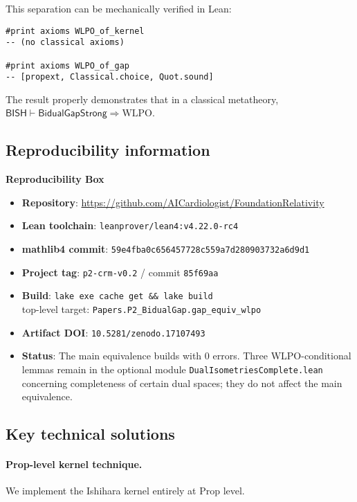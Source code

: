 \documentclass[11pt]{article}
\newcommand{\leanRepo}{\url{https://github.com/AICardiologist/FoundationRelativity}}
\newcommand{\WLPO}{\mathrm{WLPO}}
\begin{document}
This separation can be mechanically verified in Lean:
\begin{lstlisting}[language=Lean,numbers=none]
#print axioms WLPO_of_kernel
-- (no classical axioms)

#print axioms WLPO_of_gap  
-- [propext, Classical.choice, Quot.sound]
\end{lstlisting}

The result properly demonstrates that in a classical metatheory, 
$\textsf{BISH} \vdash \textsf{BidualGapStrong} \Rightarrow \WLPO$.

\subsection{Reproducibility information}

\begin{mdframed}[backgroundcolor=gray!10]
\textbf{Reproducibility Box}
\begin{itemize}
\item \textbf{Repository}: \leanRepo
\item \textbf{Lean toolchain}: \texttt{leanprover/lean4:v4.22.0-rc4}
\item \textbf{mathlib4 commit}: \texttt{59e4fba0c656457728c559a7d280903732a6d9d1}
\item \textbf{Project tag}: \texttt{p2-crm-v0.2} / commit \texttt{85f69aa}
\item \textbf{Build}: \texttt{lake exe cache get \&\& lake build} \\
      top-level target: \texttt{Papers.P2\_BidualGap.gap\_equiv\_wlpo}
\item \textbf{Artifact DOI}: \texttt{10.5281/zenodo.17107493}
\item \textbf{Status}: The main equivalence builds with 0 errors. Three WLPO-conditional lemmas remain in the optional module \texttt{DualIsometriesComplete.lean} concerning completeness of certain dual spaces; they do not affect the main equivalence.
\end{itemize}
\end{mdframed}

\subsection{Key technical solutions}

\paragraph{Prop-level kernel technique.}
We implement the Ishihara kernel entirely at Prop level.
\end{document}
